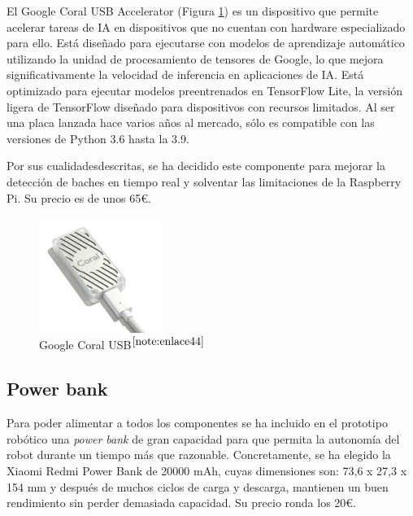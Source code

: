 El Google Coral USB Accelerator (Figura \ref{fig:googlecoral}) es un dispositivo que permite acelerar tareas de \ac{IA} en dispositivos que no cuentan con hardware especializado para ello. Está diseñado para ejecutarse con modelos de aprendizaje automático utilizando la unidad de procesamiento de tensores de Google, lo que mejora significativamente la velocidad de inferencia en aplicaciones de \acs{IA}. Está optimizado para ejecutar modelos preentrenados en TensorFlow Lite, la versión ligera de TensorFlow diseñado para dispositivos con recursos limitados. Al ser una placa lanzada hace varios años al mercado, sólo es compatible con  las versiones de Python 3.6 hasta la 3.9.

Por sus cualidadesdescritas, se ha decidido este componente para mejorar la detección de baches en tiempo real y solventar las limitaciones de la Raspberry Pi. Su precio es de unos 65€.
 
\begin{figure} [h!]
	\begin{center}
		\includegraphics[width=4cm]{figs/googlecoral.png}
	\end{center}
	\caption{Google Coral USB$^{\ref{note:enlace44}}$} 
	\label{fig:googlecoral}
\end{figure}

\setcounter{footnote}{44} %

\subsection{Power bank}

Para poder alimentar a todos los componentes se ha incluido en el prototipo robótico una \textit{power bank} de gran capacidad para que permita la autonomía del robot durante un tiempo más que razonable. Concretamente, se ha elegido la Xiaomi Redmi Power Bank de 20000 mAh, cuyas dimensiones son: 73,6 x 27,3 x 154 mm y después de muchos ciclos de carga y descarga, mantienen un buen rendimiento sin perder demasiada capacidad. Su precio ronda los 20€. %

